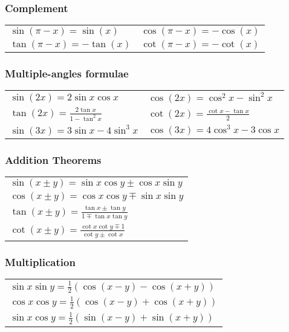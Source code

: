 \documentclass[a4paper, 10pt]{article}
\theoremstyle{definition}
\begin{document}
\subsubsection*{Complement}
\begin{tabularx}{\linewidth}{XX}
    $\sin(\pi - x) = \sin(x)$ & $\cos(\pi - x) = -\cos(x)$ \\
    $\tan(\pi - x) = - \tan(x)$ & $\cot(\pi - x) = -\cot(x)$
\end{tabularx}

\subsubsection*{Multiple-angles formulae}
\begin{tabularx}{\linewidth}{XX}
    $\sin(2x) = 2 \sin x \cos x $ & $\cos(2x) = \cos^2x - \sin^2x$ \\
    $\tan(2x) = \frac{2 \tan x}{1 - \tan^2x}$ & $\cot(2x) = \frac{\cot x - \tan x}{2}$ \\
    $\sin(3x) = 3 \sin x - 4 \sin^3 x$ & $\cos(3x) = 4 \cos^3 x - 3 \cos x$
\end{tabularx}

\subsubsection*{Addition Theorems}
\begin{tabularx}{\linewidth}{X}
    $\sin(x \pm y) = \sin x \cos y \pm \cos x \sin y$ \\
    $\cos(x \pm y) = \cos x \cos y \mp \sin x \sin y$ \\
    $\tan(x \pm y) = \frac{\tan x \pm \tan y}{1 \mp \tan x \tan y}$ \\
    $\cot(x \pm y) = \frac{\cot x \cot y \mp 1}{\cot y \pm \cot x}$
\end{tabularx}

\subsubsection*{Multiplication}
\begin{tabularx}{\linewidth}{X}
    $\sin x \sin y = \frac{1}{2}(\cos(x - y) - \cos(x + y))$ \\
    $\cos x \cos y = \frac{1}{2}(\cos(x - y) + \cos(x + y))$ \\
    $\sin x \cos y = \frac{1}{2}(\sin(x - y) + \sin(x + y))$ \\
\end{tabularx}
\end{document}
